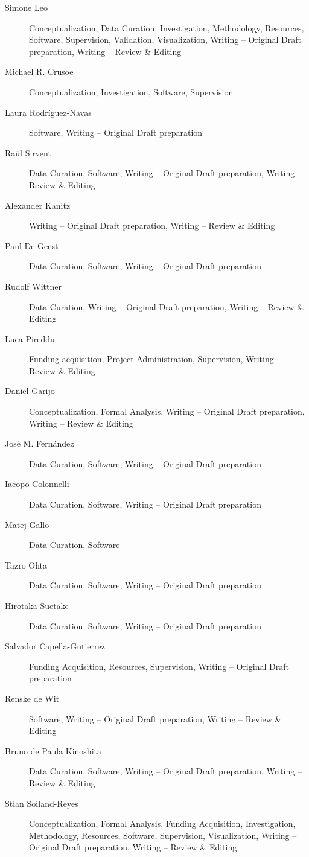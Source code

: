 \documentclass[10pt,letterpaper]{article}
\begin{document}
\begin{description}
\item[Simone Leo]
Conceptualization, Data Curation, Investigation, Methodology, Resources, Software, Supervision, Validation, Visualization, Writing -- Original Draft preparation, Writing -- Review \& Editing
\item[Michael R. Crusoe]
Conceptualization, Investigation, Software, Supervision
\item[Laura Rodríguez-Navas]
Software, Writing -- Original Draft preparation
\item[Raül Sirvent]
Data Curation, Software, Writing -- Original Draft preparation, Writing -- Review \& Editing
\item[Alexander Kanitz]
Writing -- Original Draft preparation, Writing -- Review \& Editing
\item[Paul De Geest]
Data Curation, Software, Writing -- Original Draft preparation
\item[Rudolf Wittner]
Data Curation, Writing -- Original Draft preparation, Writing -- Review \& Editing
\item[Luca Pireddu]
Funding acquisition, Project Administration, Supervision, Writing -- Review \& Editing
\item[Daniel Garijo]
Conceptualization, Formal Analysis, Writing -- Original Draft preparation, Writing -- Review \& Editing
\item[José M. Fernández]
Data Curation, Software, Writing -- Original Draft preparation
\item[Iacopo Colonnelli]
Data Curation, Software, Writing -- Original Draft preparation
\item[Matej Gallo]
Data Curation, Software
\item[Tazro Ohta]
Data Curation, Software, Writing -- Original Draft preparation
\item[Hirotaka Suetake]
Data Curation, Software, Writing -- Original Draft preparation
\item[Salvador Capella-Gutierrez]
Funding Acquisition, Resources, Supervision, Writing -- Original Draft preparation
\item[Renske de Wit]
Software, Writing -- Original Draft preparation, Writing -- Review \& Editing
\item[Bruno de Paula Kinoshita]
Data Curation, Software, Writing -- Original Draft preparation, Writing -- Review \& Editing
\item[Stian Soiland-Reyes]
Conceptualization, Formal Analysis, Funding Acquisition, Investigation, Methodology, Resources, Software, Supervision, Visualization, Writing -- Original Draft preparation, Writing -- Review \& Editing
\end{description}
\end{document}
